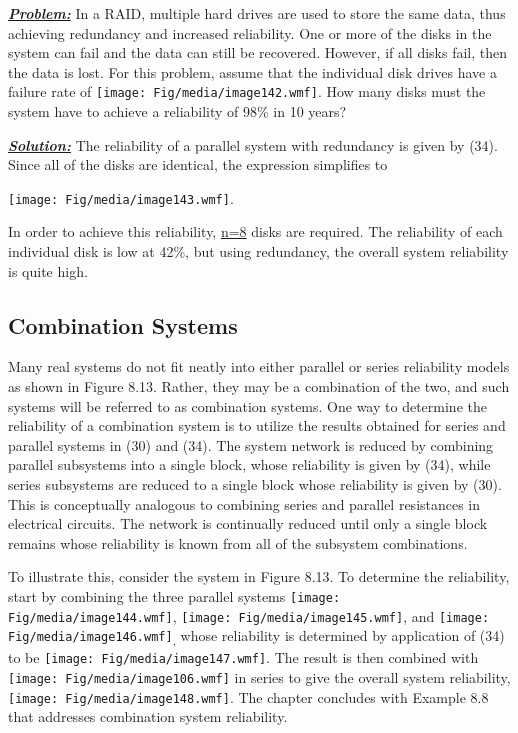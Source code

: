 \emph{\textbf{\ul{Problem:}}} In a RAID, multiple hard drives are used
to store the same data, thus achieving redundancy and increased
reliability. One or more of the disks in the system can fail and the
data can still be recovered. However, if all disks fail, then the data
is lost. For this problem, assume that the individual disk drives have a
failure rate of \texttt{[image: Fig/media/image142.wmf]}. How many disks
must the system have to achieve a reliability of 98\% in 10 years?

\emph{\textbf{\ul{Solution:}}} The reliability of a parallel system with
redundancy is given by (34). Since all of the disks are identical, the
expression simplifies to

\texttt{[image: Fig/media/image143.wmf]}.

In order to achieve this reliability, \ul{n=8} disks are required. The
reliability of each individual disk is low at 42\%, but using
redundancy, the overall system reliability is quite high.

\subsection{Combination Systems}\label{combination-systems}

Many real systems do not fit neatly into either parallel or series
reliability models as shown in Figure 8.13. Rather, they may be a
combination of the two, and such systems will be referred to as
combination systems. One way to determine the reliability of a
combination system is to utilize the results obtained for series and
parallel systems in (30) and (34). The system network is reduced by
combining parallel subsystems into a single block, whose reliability is
given by (34), while series subsystems are reduced to a single block
whose reliability is given by (30). This is conceptually analogous to
combining series and parallel resistances in electrical circuits. The
network is continually reduced until only a single block remains whose
reliability is known from all of the subsystem combinations.

To illustrate this, consider the system in Figure 8.13. To determine the
reliability, start by combining the three parallel systems
\texttt{[image: Fig/media/image144.wmf]},
\texttt{[image: Fig/media/image145.wmf]}, and
\texttt{[image: Fig/media/image146.wmf]}\textsubscript{,} whose
reliability is determined by application of (34) to be
\texttt{[image: Fig/media/image147.wmf]}. The result is then combined
with \texttt{[image: Fig/media/image106.wmf]} in series to give the
overall system reliability, \texttt{[image: Fig/media/image148.wmf]}.
The chapter concludes with Example 8.8 that addresses combination system
reliability.

